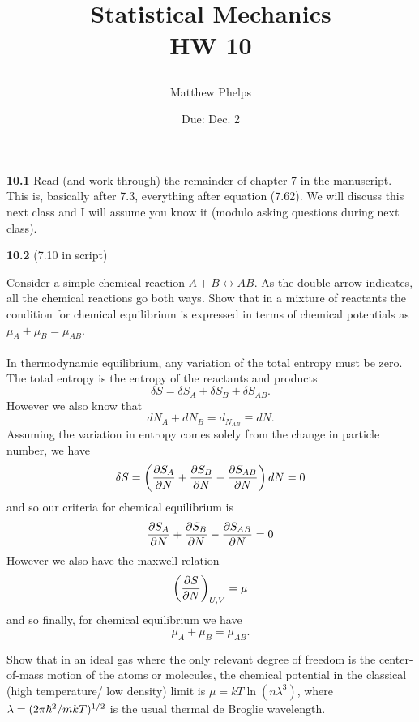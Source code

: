 \documentclass[11pt,letterpaper]{article}
\title{\begin{spacing}{1.2}Statistical Mechanics\\HW 10\end{spacing}}
\author{Matthew Phelps}
\date{Due: Dec. 2}
\begin{document}
\maketitle

\benum
  	\item[\textbf{10.1}]
	Read (and work through) the remainder of chapter 7 in the manuscript. This is, basically after
	7.3, everything after equation (7.62). We will discuss this next class and I will assume you know it
	(modulo asking questions during next class).
 	\\
	
	\item[\textbf{10.2}]
	(7.10 in script)
	\benum
		\item
		Consider a simple chemical reaction $A+B \leftrightarrow AB$. As the double arrow indicates,
		all the chemical reactions go both ways. Show that in a mixture of reactants  the condition for 
		chemical equilibrium is expressed in terms of chemical potentials as $\mu_A+\mu_B = \mu_{AB}$.
		\\ \\
		In thermodynamic equilibrium, any variation of the total entropy must be zero. The
		total entropy is the entropy of the reactants and products
		\[
			\delta S = \delta S_A+\delta S_B +\delta S_{AB}.
		\]
		However we also know that 
		\[
			dN_A+dN_B = d_{N_{AB}} \equiv dN.
		\]
		Assuming the variation in entropy comes solely from the change in particle number, we have
		\[
			\delta S = \plr{\pdiff[S_A]{N} +\pdiff[S_B]{N} - \pdiff[S_{AB}]{N}}dN = 0
		\]
		and so our criteria for chemical equilibrium is
		\[
			 \pdiff[S_A]{N} +\pdiff[S_B]{N} - \pdiff[S_{AB}]{N} = 0
		\]
		However we also have the maxwell relation
		\[
			\plr{\pdiff[S]{N}}_{U,V} = \mu
		\]
		and so finally, for chemical equilibrium we have
		\[
			\mu_A+\mu_B = \mu_{AB}.
		\]
		\item
		Show that in an ideal gas where the only relevant degree of freedom is the center-of-mass
		motion of the atoms or molecules, the chemical potential in the classical (high temperature/
		low density) limit is $\mu = kT\ln(n\lambda^3)$, where $\lambda = (2\pi\h^2/mkT)^{1/2}$ is 
		the usual thermal de Broglie wavelength. 
		\\ \\
\end{document}
